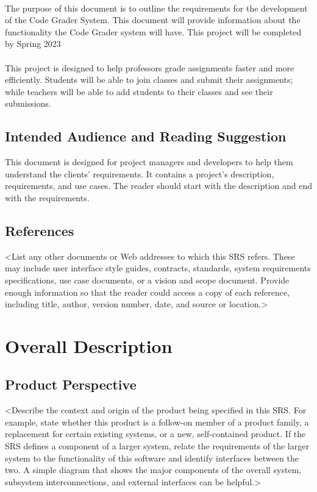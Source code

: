 \documentclass{article}
\begin{document}
\paragraph{} The purpose of this document is to outline the requirements for the development of the Code Grader System. This document will provide information about the functionality the Code Grader system will have. This project will be completed by Spring 2023

\paragraph{} This project is designed to help professors grade assignments faster and more efficiently. Students will be able to join classes and submit their assignments; while teachers will be able to add students to their classes and see their submissions.

\subsection{Intended Audience and Reading Suggestion}

This document is designed for project managers and developers to help them understand the clients' requirements. It contains a project's description, requirements, and use cases. The reader should start with the description and end with the requirements.

\subsection{References}
<List any other documents or Web addresses to which this SRS refers. These may include user interface style guides, contracts, standards, system requirements specifications, use case documents, or a vision and scope document. Provide enough information so that the reader could access a copy of each reference, including title, author, version number, date, and source or location.>
\section{Overall Description}

\subsection{Product Perspective}
<Describe the context and origin of the product being specified in this SRS. For example, state whether this product is a follow-on member of a product family, a replacement for certain existing systems, or a new, self-contained product. If the SRS defines a component of a larger system, relate the requirements of the larger system to the functionality of this software and identify interfaces between the two. A simple diagram that shows the major components of the overall system, subsystem interconnections, and external interfaces can be helpful.>
\end{document}
